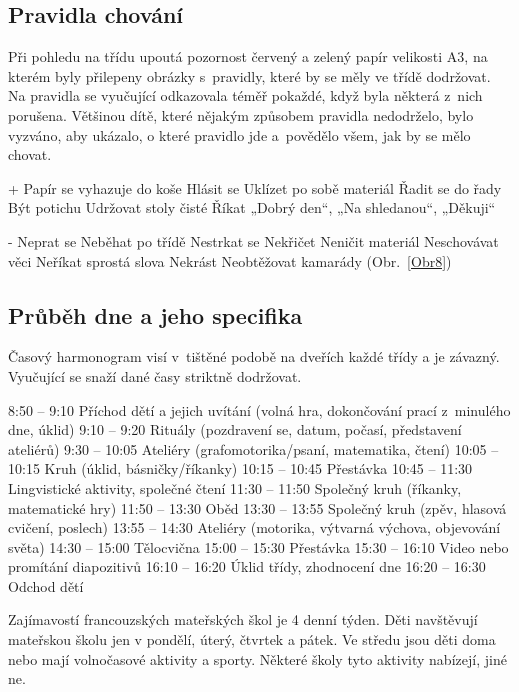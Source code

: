		\subsection{Pravidla chování}
		\label{pravidlaChovani}
			Při pohledu na třídu upoutá pozornost červený a zelený papír velikosti A3, na kterém byly přilepeny obrázky s pravidly, které by se měly ve třídě dodržovat. Na pravidla se vyučující odkazovala téměř pokaždé, když byla některá z nich porušena. Většinou dítě, které nějakým způsobem pravidla nedodrželo, bylo vyzváno, aby ukázalo, o které pravidlo jde a povědělo všem, jak by se mělo chovat. 

+	Papír se vyhazuje do koše
	Hlásit se
	Uklízet po sobě materiál
	Řadit se do řady
	Být potichu
	Udržovat stoly čisté
Říkat „Dobrý den“, „Na shledanou“, „Děkuji“

- 	Neprat se
	Neběhat po třídě
	Nestrkat se
	Nekřičet
	Neničit materiál
	Neschovávat věci
	Neříkat sprostá slova
	Nekrást
	Neobtěžovat kamarády
(Obr.~\ref{Obr8})

		\subsection{Průběh dne a jeho specifika}

			Časový harmonogram visí v tištěné podobě na dveřích každé třídy a je závazný. Vyučující se snaží dané časy striktně dodržovat.

8:50 – 9:10	Příchod dětí a jejich uvítání (volná hra, dokončování prací z minulého dne, úklid)
9:10 – 9:20			Rituály (pozdravení se, datum, počasí, představení ateliérů)
9:30 – 10:05			Ateliéry (grafomotorika/psaní, matematika, čtení)
10:05 – 10:15			Kruh (úklid, básničky/říkanky)
10:15 – 10:45			Přestávka
10:45 – 11:30			Lingvistické aktivity, společné čtení
11:30 – 11:50			Společný kruh (říkanky, matematické hry)
11:50 – 13:30			Oběd
13:30 – 13:55			Společný kruh (zpěv, hlasová cvičení, poslech)
13:55 – 14:30			Ateliéry (motorika, výtvarná výchova, objevování světa)
14:30 – 15:00			Tělocvična
15:00 – 15:30			Přestávka
15:30 – 16:10			Video nebo promítání diapozitivů
16:10 – 16:20			Úklid třídy, zhodnocení dne
16:20 – 16:30			Odchod dětí

			Zajímavostí francouzských mateřských škol je 4 denní týden. Děti navštěvují mateřskou školu jen v pondělí, úterý, čtvrtek a pátek. Ve středu jsou děti doma nebo mají volnočasové aktivity a sporty. Některé školy tyto aktivity nabízejí, jiné ne. 

